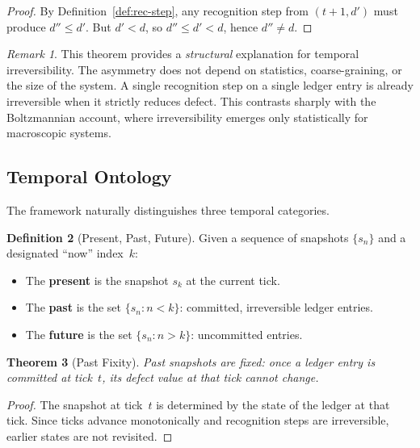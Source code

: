 \documentclass[12pt,a4paper]{article}
\newtheorem{theorem}{Theorem}[section]
\theoremstyle{definition}
\newtheorem{definition}[theorem]{Definition}
\theoremstyle{remark}
\newtheorem{remark}[theorem]{Remark}
\begin{document}
\begin{proof}
By Definition~\ref{def:rec-step}, any recognition step from $(t+1, d')$
must produce $d'' \leq d'$.  But $d' < d$, so $d'' \leq d' < d$, hence
$d'' \neq d$.
\end{proof}

\begin{remark}
This theorem provides a \emph{structural} explanation for temporal
irreversibility.  The asymmetry does not depend on statistics, coarse-graining,
or the size of the system.  A single recognition step on a single ledger
entry is already irreversible when it strictly reduces defect.  This
contrasts sharply with the Boltzmannian account, where irreversibility
emerges only statistically for macroscopic systems.
\end{remark}

\subsection{Temporal Ontology}

The framework naturally distinguishes three temporal categories.

\begin{definition}[Present, Past, Future]
\label{def:ppf}
Given a sequence of snapshots $\{s_n\}$ and a designated ``now'' index~$k$:
\begin{itemize}
  \item The \textbf{present} is the snapshot $s_k$ at the current tick.
  \item The \textbf{past} is the set $\{s_n : n < k\}$: committed,
    irreversible ledger entries.
  \item The \textbf{future} is the set $\{s_n : n > k\}$: uncommitted
    entries.
\end{itemize}
\end{definition}

\begin{theorem}[Past Fixity]
\label{thm:past-fixed}
Past snapshots are fixed: once a ledger entry is committed at tick~$t$,
its defect value at that tick cannot change.
\end{theorem}

\begin{proof}
The snapshot at tick~$t$ is determined by the state of the ledger at
that tick.  Since ticks advance monotonically and recognition steps are
irreversible, earlier states are not revisited.
\end{proof}
\end{document}
